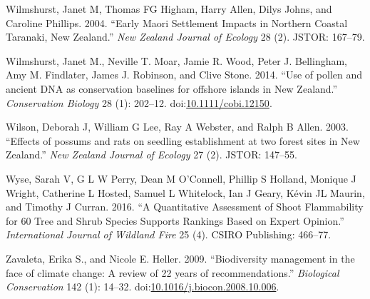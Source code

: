 \documentclass[]{article}
\begin{document}
Wilmshurst, Janet M, Thomas FG Higham, Harry Allen, Dilys Johns, and Caroline Phillips. 2004. ``Early Maori Settlement Impacts in Northern Coastal Taranaki, New Zealand.'' \emph{New Zealand Journal of Ecology} 28 (2). JSTOR: 167--79.

Wilmshurst, Janet M., Neville T. Moar, Jamie R. Wood, Peter J. Bellingham, Amy M. Findlater, James J. Robinson, and Clive Stone. 2014. ``Use of pollen and ancient DNA as conservation baselines for offshore islands in New Zealand.'' \emph{Conservation Biology} 28 (1): 202--12. doi:\href{https://doi.org/10.1111/cobi.12150}{10.1111/cobi.12150}.

Wilson, Deborah J, William G Lee, Ray A Webster, and Ralph B Allen. 2003. ``Effects of possums and rats on seedling establishment at two forest sites in New Zealand.'' \emph{New Zealand Journal of Ecology} 27 (2). JSTOR: 147--55.

Wyse, Sarah V, G L W Perry, Dean M O'Connell, Phillip S Holland, Monique J Wright, Catherine L Hosted, Samuel L Whitelock, Ian J Geary, Kévin JL Maurin, and Timothy J Curran. 2016. ``A Quantitative Assessment of Shoot Flammability for 60 Tree and Shrub Species Supports Rankings Based on Expert Opinion.'' \emph{International Journal of Wildland Fire} 25 (4). CSIRO Publishing: 466--77.

Zavaleta, Erika S., and Nicole E. Heller. 2009. ``Biodiversity management in the face of climate change: A review of 22 years of recommendations.'' \emph{Biological Conservation} 142 (1): 14--32. doi:\href{https://doi.org/10.1016/j.biocon.2008.10.006}{10.1016/j.biocon.2008.10.006}.
\end{document}
